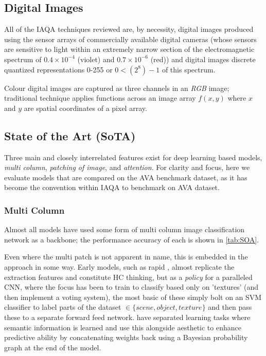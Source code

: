 \subsection{Digital Images}


All of the IAQA techniques reviewed are, by necessity, digital images produced using the sensor arrays of commercially available digital cameras (whose sensors are sensitive to light within an extremely narrow section of the electromagnetic spectrum of $0.4 \times 10^{-4} $ (violet) and $0.7 \times 10^{-6}$ (red)) and digital images discrete quantized representations 0-255 or $0 < (2^{8})-1$ of this spectrum. 

Colour digital images are captured as three channels in an \textit{RGB} image; traditional technique applies functions across an image array $f(x,y)$ where $x$ and $y$ are spatial coordinates of a pixel array. 

\subsection{State of the Art (SoTA)}
\label{SoTA}

Three main and closely interrelated features exist for deep learning based models, \textit{multi column}, \textit{patching of image}, and \textit{attention}. For clarity and focus, here we evaluate models that are compared on the AVA benchmark dataset, as it has become the convention within IAQA to benchmark on AVA dataset. 


\subsubsection{Multi Column} 

 Almost all models have used some form of multi column image classification network as a backbone; the performance accuracy of each is shown in \ref{tab:SOA}. 
 
 Even where the multi patch is not apparent in name, this is embedded in the approach in some way. Early models, such as rapid \cite{Lu2014a}, almost replicate the extraction features and constitute HC thinking, but as a \textit{policy} for a paralleled CNN, where the focus has been to train to classify based only on 'textures' (and then implement a voting system\cite{Lu2014a, Wang2016c}), the most basic of these simply bolt on an SVM classifier to label parts of the dataset $\in \{scene, object, texture\}$ and then pass these to a separate forward feed network. \cite{Koa2016b, Sheng2018} have separated learning tasks where semantic information is learned and use this alongside aesthetic to enhance predictive ability by concatenating weights back using a Bayesian probability graph at the end of the model. 
 

